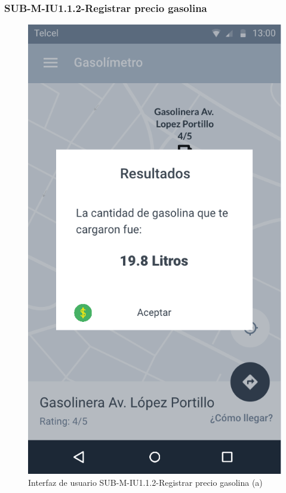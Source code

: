 \subsubsection{SUB-M-IU1.1.2-Registrar precio gasolina}\label{SUB-M-IU1.1.2}
\begin{figure}[H]
	\centering
	\includegraphics[scale=.55]{Capitulo4/software/submodulos/mediciones/images/sub-m-iu1_1_2_a}
	\caption{Interfaz de usuario SUB-M-IU1.1.2-Registrar precio gasolina (a)}
	\label{fig:sub-m-iu1.1.2.a}
\end{figure}

